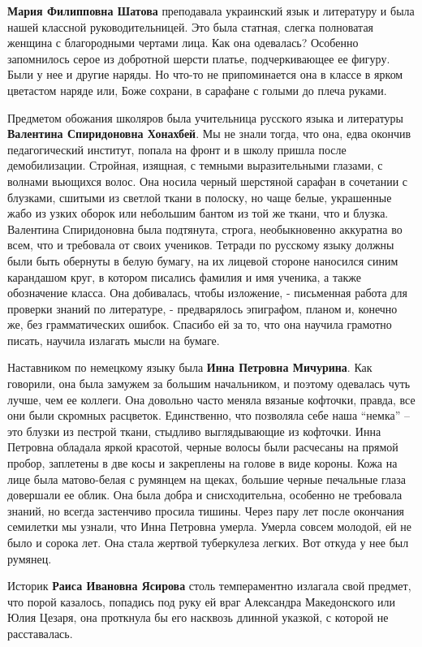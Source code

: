 \textbf{Мария Филипповна Шатова} преподавала украинский язык и литературу и была нашей
классной руководительницей. Это была статная, слегка полноватая женщина с
благородными чертами лица. Как она одевалась? Особенно запомнилось серое  из
добротной шерсти платье, подчеркивающее ее фигуру. Были у нее и другие наряды.
Но что-то не припоминается она в классе в ярком цветастом наряде или, Боже
сохрани, в сарафане с голыми до плеча руками.

Предметом обожания школяров была учительница русского языка и литературы
\textbf{Валентина Спиридоновна Хонахбей}. Мы не знали тогда, что она, едва окончив
педагогический институт, попала на фронт и в школу пришла после демобилизации.
Стройная, изящная, с темными выразительными глазами, с волнами вьющихся волос.
Она носила черный шерстяной сарафан в сочетании с блузками, сшитыми из светлой
ткани в полоску, но чаще белые, украшенные жабо из узких оборок или небольшим
бантом из той же ткани, что и блузка. Валентина Спиридоновна была подтянута,
строга, необыкновенно аккуратна во всем, что и требовала от своих учеников.
Тетради по русскому языку должны были быть обернуты в белую бумагу, на их
лицевой стороне наносился синим карандашом круг, в котором писались фамилия и
имя ученика, а также обозначение класса. Она добивалась, чтобы изложение, -
письменная работа для проверки знаний по литературе, - предварялось эпиграфом,
планом и, конечно же, без грамматических ошибок.  Спасибо ей за то, что она
научила грамотно писать, научила излагать мысли на бумаге. 

Наставником по немецкому языку была \textbf{Инна Петровна Мичурина}. Как говорили, она
была замужем за большим начальником, и поэтому одевалась чуть лучше, чем ее
коллеги.  Она довольно часто меняла вязаные кофточки, правда, все они были
скромных расцветок. Единственно, что позволяла себе наша \enquote{немка} – это блузки
из пестрой ткани, стыдливо выглядывающие из кофточки.  Инна Петровна обладала
яркой красотой, черные волосы были расчесаны на прямой пробор, заплетены в две
косы и закреплены на голове в виде короны. Кожа на лице была матово-белая с
румянцем на щеках, большие черные печальные глаза довершали ее облик. Она была
добра и снисходительна, особенно не требовала знаний, но всегда застенчиво
просила тишины. Через пару лет после окончания семилетки мы узнали, что Инна
Петровна умерла. Умерла совсем молодой, ей не было и сорока лет. Она стала
жертвой туберкулеза легких. Вот откуда у нее был румянец.

Историк \textbf{Раиса Ивановна Ясирова} столь темпераментно излагала свой предмет, что
порой казалось, попадись под руку ей враг Александра Македонского или Юлия
Цезаря, она проткнула бы его насквозь длинной указкой, с которой не
расставалась.

